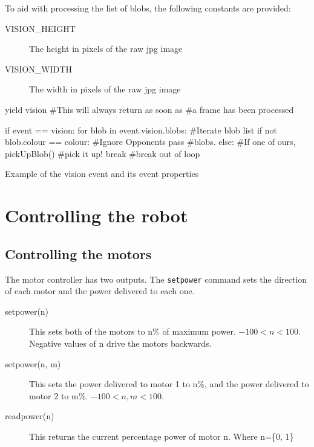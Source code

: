 \documentclass[a4paper, 12pt]{article}
\begin{document}
To aid with processing the list of blobs, the following constants are provided:
\begin{description}
\item[VISION\_HEIGHT] The height in pixels of the raw jpg image
\item[VISION\_WIDTH] The width in pixels of the raw jpg image
\end{description}

\begin{python}
\begin{verbatimtab}
yield vision    #This will always return as soon as
                #a frame has been processed

if event == vision:
	for blob in event.vision.blobs: 	#Iterate blob list 
        	if not blob.colour == colour:  	#Ignore Opponents  
                	pass			#blobs.
		else:				#If one of ours,
			pickUpBlob()           	#pick it up!
			break			#break out of loop
\end{verbatimtab}
\caption{\label{py:vision}Example of the vision event and its event properties}
\end{python}


\section{Controlling the robot}
\subsection{Controlling the motors}
The motor controller has two outputs.  The \texttt{setpower} command
sets the direction of each motor and the power delivered to each one.

\begin{description}
\item[setpower(n)] This sets both of the motors to n\% of maximum
power.  $-100<n<100$. Negative values of n drive the motors backwards.
\item[setpower(n, m)] This sets the power delivered to motor 1 to n\%,
  and the power delivered to motor 2 to m\%. $-100<n,m<100$.
\item[readpower(n)] This returns the current percentage power of motor n. Where n=\{0, 1\} 
\end{description}

\vspace{12pt}

\end{document}
